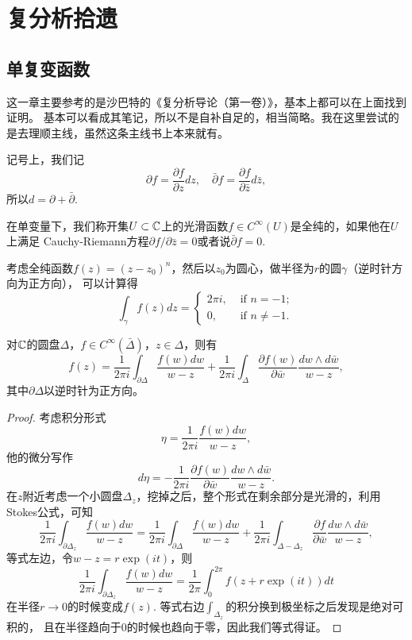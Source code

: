 \chapter{复分析拾遗}

\section{单复变函数}

这一章主要参考的是沙巴特的《复分析导论（第一卷）》，基本上都可以在上面找到证明。
基本可以看成其笔记，所以不是自补自足的，相当简略。我在这里尝试的是去理顺主线，虽然这条主线书上本来就有。

记号上，我们记
\[
    \partial f=\frac{\partial f}{\partial z}dz,\quad 
    \bar\partial f=\frac{\partial f}{\partial \bar z}d\bar z,
\]
所以$d=\partial+\bar\partial$.

在单变量下，我们称开集$U\subset \mathbb{C}$上的光滑函数$f\in C^\infty(U)$是全纯的，如果他在$U$上满足
Cauchy-Riemann方程$\partial f/\partial \bar z=0$或者说$\bar\partial f=0$.

\begin{pro}
考虑全纯函数$f(z)=(z-z_0)^n$，然后以$z_0$为圆心，做半径为$r$的圆$\gamma$（逆时针方向为正方向），
可以计算得 
\[
\int_{\gamma}f(z)dz=\begin{cases}
	2\pi i, &\text{ if }n=-1;\\
	0,&\text{ if }n\neq-1.
\end{cases}
\]
\end{pro}

\begin{thm}[Cauchy积分公式]
    对$\mathbb{C}$的圆盘$\Delta$，$f\in C^\infty (\bar\Delta)$，$z\in \Delta$，则有 
    \[
        f(z)=\frac{1}{2 \pi i} \int_{\partial \Delta} \frac{f(w) d w}{w-z}+
        \frac{1}{2 \pi i} \int_{\Delta} \frac{\partial f(w)}{\partial \bar{w}} 
        \frac{d w \wedge d \bar{w}}{w-z},
    \]
    其中$\partial \Delta$以逆时针为正方向。
\end{thm}

\begin{proof}
考虑积分形式
\[
    \eta=\frac{1}{2 \pi i} \frac{f(w) d w}{w-z},
\]
他的微分写作
\[
    d \eta=-\frac{1}{2 \pi i} \frac{\partial f(w)}{\partial \bar{w}} \frac{d w \wedge d \bar{w}}{w-z}.
\]
在$z$附近考虑一个小圆盘$\Delta_z$，挖掉之后，整个形式在剩余部分是光滑的，利用Stokes公式，可知
\[
    \frac{1}{2 \pi i} \int_{\partial \Delta_{z}} \frac{f(w) d w}{w-z}=  
    \frac{1}{2 \pi i} \int_{\partial \Delta} \frac{f(w) d w}{w-z}
+\frac{1}{2 \pi i} \int_{\Delta-\Delta_{z}} \frac{\partial f}{\partial \bar{w}} 
\frac{d w \wedge d \bar{w}}{w-z},
\]
等式左边，令$w-z=r \exp(it)$，则
\[
    \frac{1}{2 \pi i} \int_{\partial \Delta_{z}} \frac{f(w) d w}{w-z}=\frac{1}{2\pi}\int_0^{2\pi}
    f(z+r\exp(it))dt
\]
在半径$r\to 0$的时候变成$f(z)$. 等式右边$\int_{\Delta_z}$的积分换到极坐标之后发现是绝对可积的，
且在半径趋向于$0$的时候也趋向于零，因此我们等式得证。
\end{proof}


